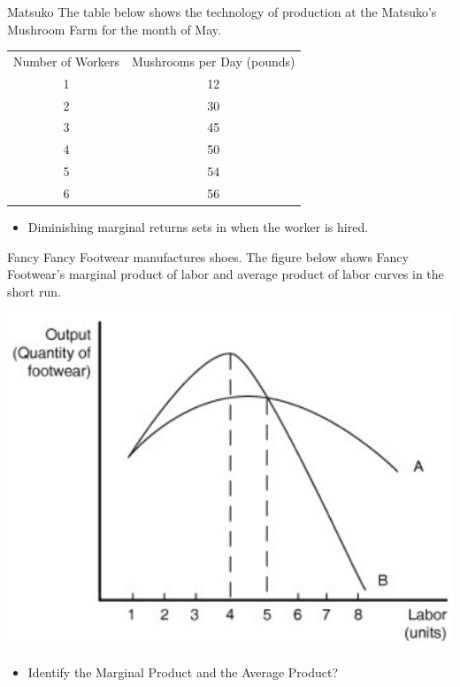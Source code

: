 \documentclass{beamer}
\begin{document}
\begin{frame}[t]{Matsuko}
    The table below shows the technology of production at the Matsuko's Mushroom Farm for the month of May.
    \begin{table}[H]
    \centering
    \begin{tabular}{cc}
    Number of Workers & Mushrooms per Day (pounds) \\
    1                 & 12                         \\ \hline
    2                 & 30                         \\ \hline
    3                 & 45                         \\ \hline
    4                 & 50                         \\ \hline
    5                 & 54                         \\ \hline
    6                 & 56                       
    \end{tabular}
    \end{table}
    \begin{itemize}
        \item Diminishing marginal returns sets in when the \underline{\phantom{fifth}} worker is hired.
    \end{itemize}
\end{frame}

\begin{frame}[t]{Fancy}
    Fancy Footwear manufactures shoes. The figure below shows Fancy Footwear's marginal product of labor and average product of labor curves in the short run.
    \begin{center}
        \includegraphics[scale = .6]{images/graph.png}
    \end{center}
    \begin{itemize}
        \item Identify the Marginal Product and the Average Product?
    \end{itemize}
\end{frame}
\end{document}
